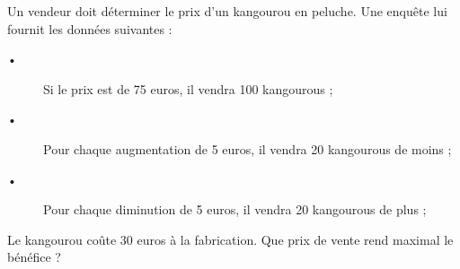 
Un vendeur doit déterminer le prix d'un kangourou en peluche. Une enquête lui fournit les données suivantes :
\begin{description}
\item[•] Si le prix est de 75 euros, il vendra 100 kangourous ;
\item[•] Pour chaque augmentation de 5 euros, il vendra 20 kangourous de moins ;
\item[•] Pour chaque diminution de 5 euros, il vendra 20 kangourous de plus ;
\end{description}
Le kangourou coûte 30 euros à la fabrication. Que prix de vente rend maximal le bénéfice ? 
